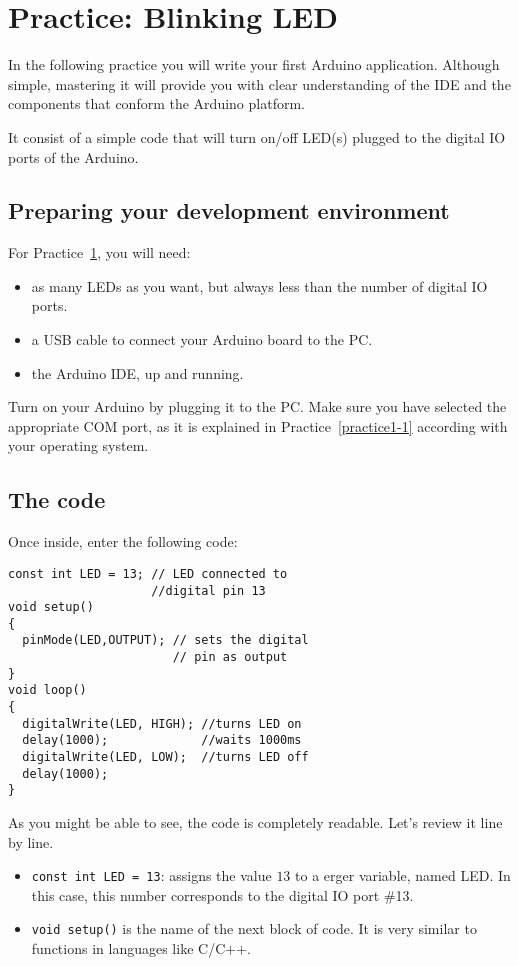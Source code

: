 \section{Practice: Blinking LED}\label{practice1-2}
In the following practice you will write your first Arduino application. Although simple, mastering it will provide you with clear understanding of the IDE and the components that conform the Arduino platform.

It consist of a simple code that will turn on/off LED(s) plugged to the digital IO ports of the Arduino.

\subsection{Preparing your development environment}
For Practice~\ref{practice1-2}, you will need:
\begin{itemize}
 \item as many LEDs as you want, but always less than the number of digital IO ports.
 \item a USB cable to connect your Arduino board to the PC.
 \item the Arduino IDE, up and running.
\end{itemize}

Turn on your Arduino by plugging it to the PC. Make sure you have selected the appropriate COM port, as it is explained in Practice~\ref{practice1-1} according with your operating system.

\subsection{The code}
Once inside, enter the following code:

\begin{verbatim}
const int LED = 13; // LED connected to 
                    //digital pin 13
void setup()
{
  pinMode(LED,OUTPUT); // sets the digital
                       // pin as output
}
void loop()
{
  digitalWrite(LED, HIGH); //turns LED on
  delay(1000);             //waits 1000ms
  digitalWrite(LED, LOW);  //turns LED off
  delay(1000);
}
\end{verbatim}

As you might be able to see, the code is completely readable. Let's review it line by line.

\begin{itemize}
 \item \texttt{const int LED = 13}: assigns the value $13$ to a \texttt{\color{red}{int}}erger variable, named LED. In this case, this number corresponds to the digital IO port \#13.
 \item \texttt{void setup()} is the name of the next block of code. It is very similar to functions in languages like C/C++.
\end{itemize}
